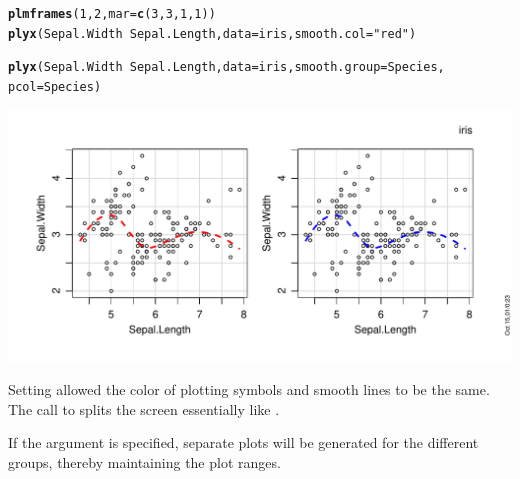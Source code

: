 \documentclass[11pt]{article}\usepackage[]{graphicx}\usepackage[]{color}
\makeatletter
\def\maxwidth{ %
  \ifdim\Gin@nat@width>\linewidth
    \linewidth
  \else
    \Gin@nat@width
  \fi
}
\newcommand{\hlnum}[1]{\textcolor[rgb]{0.686,0.059,0.569}{#1}}%
\newcommand{\hlstr}[1]{\textcolor[rgb]{0.192,0.494,0.8}{#1}}%
\newcommand{\hlopt}[1]{\textcolor[rgb]{0,0,0}{#1}}%
\newcommand{\hlstd}[1]{\textcolor[rgb]{0.345,0.345,0.345}{#1}}%
\newcommand{\hlkwc}[1]{\textcolor[rgb]{0.333,0.667,0.333}{#1}}%
\newcommand{\hlkwd}[1]{\textcolor[rgb]{0.737,0.353,0.396}{\textbf{#1}}}%
\newenvironment{kframe}{%
 \def\at@end@of@kframe{}%
 \ifinner\ifhmode%
  \def\at@end@of@kframe{\end{minipage}}%
  \begin{minipage}{\columnwidth}%
 \fi\fi%
 \def\FrameCommand##1{\hskip\@totalleftmargin \hskip-\fboxsep
 \colorbox{shadecolor}{##1}\hskip-\fboxsep
     \hskip-\linewidth \hskip-\@totalleftmargin \hskip\columnwidth}%
 \MakeFramed {\advance\hsize-\width
   \@totalleftmargin\z@ \linewidth\hsize
   \@setminipage}}%
 {\par\unskip\endMakeFramed%
 \at@end@of@kframe}
\newenvironment{knitrout}{}{} %
\makeatother
\begin{document}
\begin{knitrout}
\color{fgcolor}\begin{kframe}
\begin{alltt}
\hlkwd{plmframes}\hlstd{(}\hlnum{1}\hlstd{,}\hlnum{2}\hlstd{,} \hlkwc{mar}\hlstd{=}\hlkwd{c}\hlstd{(}\hlnum{3}\hlstd{,}\hlnum{3}\hlstd{,}\hlnum{1}\hlstd{,}\hlnum{1}\hlstd{))}
\hlkwd{plyx}\hlstd{(Sepal.Width}\hlopt{~}\hlstd{Sepal.Length,} \hlkwc{data}\hlstd{=iris,} \hlkwc{smooth.col}\hlstd{=}\hlstr{"red"}\hlstd{)}

\hlkwd{plyx}\hlstd{(Sepal.Width}\hlopt{~}\hlstd{Sepal.Length,} \hlkwc{data}\hlstd{=iris,} \hlkwc{smooth.group}\hlstd{=Species,}
     \hlkwc{pcol}\hlstd{=Species)}
\end{alltt}
\end{kframe}
\includegraphics[width=\maxwidth]{figure/plyx_smooth-1} 

\end{knitrout}
Setting  allowed the color of plotting symbols and smooth
lines to be the same.
The call to  splits the screen essentially like 
.

If the argument  is specified, separate plots will be generated
for the different groups, thereby maintaining the plot ranges.
\end{document}

